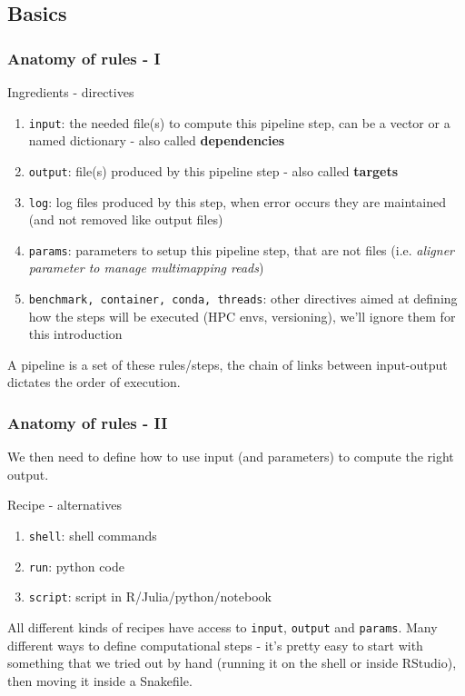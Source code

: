 \documentclass[xcolor=table]{beamer}
\begin{document}
\subsection{Basics}
\begin{frame}
\frametitle{Anatomy of rules - I}
\begin{footnotesize}
\begin{beamerboxesrounded}[upper=upper_box2,lower=lower_box,shadow=true]{Ingredients - directives}
\begin{enumerate}
\item \texttt{input}: the needed file(s) to compute this pipeline step, can be a vector or a named dictionary - also called \textbf{dependencies}
\item \texttt{output}: file(s) produced by this pipeline step - also called \textbf{targets}
\item \texttt{log}: log files produced by this step, when error occurs they are maintained (and not removed like output files)
\item \texttt{params}: parameters to setup this pipeline step, that are not files (i.e. \emph{aligner parameter to manage multimapping reads})
\item \texttt{benchmark, container, conda, threads}: other directives aimed at defining how the steps will be executed (HPC envs, versioning), we'll ignore them for this introduction
\end{enumerate}
\end{beamerboxesrounded}
\end{footnotesize}
A pipeline is a set of these rules/steps, the chain of links between input-output dictates the order of execution.
\end{frame}


\begin{frame}
\frametitle{Anatomy of rules - II}
We then need to define how to use input (and parameters) to compute the right output.
\begin{beamerboxesrounded}[upper=upper_box3,lower=lower_box,shadow=true]{Recipe - alternatives}
\begin{enumerate}
\item \texttt{shell}: shell commands
\item \texttt{run}: python code
\item \texttt{script}: script in R/Julia/python/notebook
\end{enumerate}
\end{beamerboxesrounded}
All different kinds of recipes have access to \texttt{input}, \texttt{output} and \texttt{params}.
Many different ways to define computational steps - it's pretty easy to start with something that we tried out by hand (running
it on the shell or inside RStudio), then moving it inside a Snakefile.
\end{frame}
\end{document}
